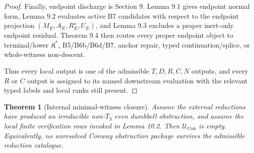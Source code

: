 \documentclass[11pt]{amsart}
\newtheorem{theorem}{Theorem}[section]
\theoremstyle{definition}
\begin{document}
\begin{proof}
Finally, endpoint discharge is Section 9. Lemma 9.1 gives endpoint normal form,
Lemma 9.2 evaluates active B7 candidates with respect to the endpoint projection
\((M_E,A_E,R_E^\star,U_E)\), and Lemma 9.3 excludes a proper inert-only endpoint
residual. Theorem 9.4 then routes every proper endpoint object to terminal/lower
\(\mathfrak K^\ast\), B5/B6b/B6d/B7, anchor repair, typed continuation/splice, or
whole-witness non-descent.

Thus every local output is one of the admissible \(T,D,R,C,N\) outputs, and every
\(R\) or \(C\) output is assigned to its named downstream evaluation with the
relevant typed labels and local ranks still present.

\end{proof}
\begin{theorem}[Internal minimal-witness closure]
Assume the external
reductions have produced an irreducible non-\(T_3\) even dumbbell obstruction, and
assume the local finite verification rows invoked in Lemma 10.2. Then
\(\mathcal U_{\mathrm{Con}}\) is empty. Equivalently, no unresolved Conway
obstruction package survives the admissible reduction catalogue.

\end{theorem}
\end{document}
